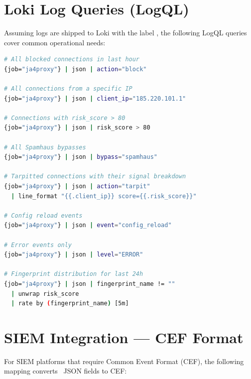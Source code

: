 \section{Loki Log Queries (LogQL)}

Assuming logs are shipped to Loki with the label , the
following LogQL queries cover common operational needs:

\begin{lstlisting}[language=bash]
# All blocked connections in last hour
{job="ja4proxy"} | json | action="block"

# All connections from a specific IP
{job="ja4proxy"} | json | client_ip="185.220.101.1"

# Connections with risk_score > 80
{job="ja4proxy"} | json | risk_score > 80

# All Spamhaus bypasses
{job="ja4proxy"} | json | bypass="spamhaus"

# Tarpitted connections with their signal breakdown
{job="ja4proxy"} | json | action="tarpit"
  | line_format "{{.client_ip}} score={{.risk_score}}"

# Config reload events
{job="ja4proxy"} | json | event="config_reload"

# Error events only
{job="ja4proxy"} | json | level="ERROR"

# Fingerprint distribution for last 24h
{job="ja4proxy"} | json | fingerprint_name != ""
  | unwrap risk_score
  | rate by (fingerprint_name) [5m]
\end{lstlisting}

\section{SIEM Integration — CEF Format}

For SIEM platforms that require Common Event Format (CEF), the following mapping
converts \ja\ JSON fields to CEF:

